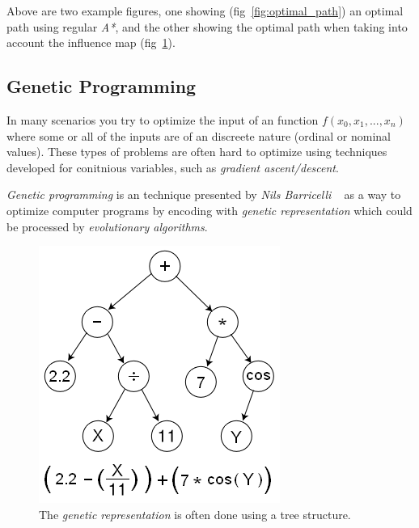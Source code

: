 \documentclass[a4paper, twocolumn]{article}
\begin{document}
\begin{minipage}{\linewidth}
\begin{minipage}{0.4\linewidth}
\begin{figure}[H]
		\caption{}
		\label{fig:smart_path}
	\end{figure}
	\end{minipage}
\end{minipage}
	Above are two example figures, one showing (fig~\ref{fig:optimal_path}) an optimal path using regular \emph{A*}, and the other showing the optimal path when taking into account the influence map (fig~\ref{fig:smart_path}).
	
	\subsection{Genetic Programming} \label{sec:genetic_programming}

	In many scenarios you try to optimize the input of an function \(f(x_0,x_1,...,x_n)\) where some or all of the inputs are of an discreete nature (ordinal or nominal values). These types of problems are often hard to optimize using techniques developed for conitnious variables, such as \emph{gradient ascent/descent}.

	\emph{Genetic programming} is an technique presented by \emph{Nils Barricelli} ~\cite{barricelli1954esempi} as a way to optimize computer programs by encoding with \emph{genetic representation} which could be processed by \emph{evolutionary algorithms}. 

	\begin{figure}[H]
		\includegraphics[width=0.8\linewidth]{share/Genetic_Program_Tree.png}
		\caption{The \emph{genetic representation} is often done using a tree structure.}
		\label{fig:genetic_representation}
	\end{figure}
\end{document}
